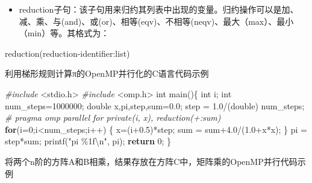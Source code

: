 \documentclass[]{ctexbook}
\newenvironment{Shaded}{\begin{snugshade}}{\end{snugshade}}
\newcommand{\ControlFlowTok}[1]{\textcolor[rgb]{0.13,0.29,0.53}{\textbf{#1}}}
\newcommand{\DataTypeTok}[1]{\textcolor[rgb]{0.13,0.29,0.53}{#1}}
\newcommand{\DecValTok}[1]{\textcolor[rgb]{0.00,0.00,0.81}{#1}}
\newcommand{\FloatTok}[1]{\textcolor[rgb]{0.00,0.00,0.81}{#1}}
\newcommand{\ImportTok}[1]{#1}
\newcommand{\NormalTok}[1]{#1}
\newcommand{\PreprocessorTok}[1]{\textcolor[rgb]{0.56,0.35,0.01}{\textit{#1}}}
\newcommand{\SpecialCharTok}[1]{\textcolor[rgb]{0.00,0.00,0.00}{#1}}
\newcommand{\StringTok}[1]{\textcolor[rgb]{0.31,0.60,0.02}{#1}}
\providecommand{\tightlist}{%
  \setlength{\itemsep}{0pt}\setlength{\parskip}{0pt}}
\begin{document}
\begin{itemize}
\tightlist
\item
  reduction子句：该子句用来归约其列表中出现的变量。归约操作可以是加、减、乘、与(and)、或(or)、相等(eqv)、不相等(neqv)、最大（max）、最小（min）等。其格式为：
\end{itemize}

\begin{Shaded}
\begin{Highlighting}[]
\NormalTok{reduction(reduction{-}identifier:list)}
\end{Highlighting}
\end{Shaded}

利用梯形规则计算π的OpenMP并行化的C语言代码示例

\begin{Shaded}
\begin{Highlighting}[]
\PreprocessorTok{\#include }\ImportTok{\textless{}stdio.h\textgreater{}}
\PreprocessorTok{\#include }\ImportTok{\textless{}omp.h\textgreater{}}
\DataTypeTok{int}\NormalTok{ main()\{}
    \DataTypeTok{int}\NormalTok{ i;}
    \DataTypeTok{int}\NormalTok{ num\_steps=}\DecValTok{1000000}\NormalTok{;}
    \DataTypeTok{double}\NormalTok{ x,pi,step,sum=}\FloatTok{0.0}\NormalTok{;}
\NormalTok{    step = }\FloatTok{1.0}\NormalTok{/(}\DataTypeTok{double}\NormalTok{) num\_steps;}
    \PreprocessorTok{\# pragma omp parallel for private(i, x), reduction(+:sum)}
    \ControlFlowTok{for}\NormalTok{(i=}\DecValTok{0}\NormalTok{;i\textless{}num\_steps;i++)}
\NormalTok{    \{  }
\NormalTok{        x=(i+}\FloatTok{0.5}\NormalTok{)*step;}
\NormalTok{        sum = sum+}\FloatTok{4.0}\NormalTok{/(}\FloatTok{1.0}\NormalTok{+x*x);}
\NormalTok{    \}}
\NormalTok{    pi = step*sum;}
\NormalTok{    printf(}\StringTok{"pi \%1f}\SpecialCharTok{\textbackslash{}n}\StringTok{"}\NormalTok{, pi);}
    \ControlFlowTok{return} \DecValTok{0}\NormalTok{;}
\NormalTok{\}}
\end{Highlighting}
\end{Shaded}

将两个n阶的方阵A和B相乘，结果存放在方阵C中，矩阵乘的OpenMP并行代码示例
\end{document}
